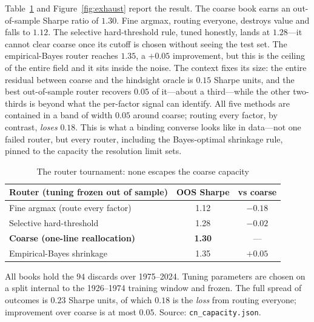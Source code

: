 \documentclass[12pt]{article}
\theoremstyle{plain}
\theoremstyle{definition}
\begin{document}
Table~\ref{tab:exhaustion} and Figure~\ref{fig:exhaust} report the result. The
coarse book earns an out-of-sample Sharpe ratio of $1.30$. Fine argmax, routing
everyone, destroys value and falls to $1.12$. The selective hard-threshold rule,
tuned honestly, lands at $1.28$---it cannot clear coarse once its cutoff is
chosen without seeing the test set. The empirical-Bayes router reaches $1.35$,
a $+0.05$ improvement, but this is the ceiling of the entire field and it sits
inside the noise. The context fixes its size: the entire residual between coarse
and the hindsight oracle is $0.15$ Sharpe units, and the best out-of-sample
router recovers $0.05$ of it---about a third---while the other two-thirds is
beyond what the per-factor signal can identify. All five methods are contained in a band of
width $0.05$ around coarse; routing every factor, by contrast, \emph{loses}
$0.18$. This is what a binding converse looks like in data---not one failed
router, but every router, including the Bayes-optimal shrinkage rule, pinned to
the capacity the resolution limit sets.

\begin{table}[t]
\centering
\caption{The router tournament: none escapes the coarse capacity}
\label{tab:exhaustion}
\begin{threeparttable}
\begin{tabular}{lcc}
\toprule
Router (tuning frozen out of sample) & OOS Sharpe & vs coarse \\
\midrule
Fine argmax (route every factor)        & 1.12 & $-0.18$ \\
Selective hard-threshold                & 1.28 & $-0.02$ \\
\textbf{Coarse (one-line reallocation)} & \textbf{1.30} & --- \\
Empirical-Bayes shrinkage               & 1.35 & $+0.05$ \\
\bottomrule
\end{tabular}
\begin{tablenotes}\footnotesize
\item All books hold the $94$ discards over 1975--2024. Tuning parameters are
chosen on a split internal to the 1926--1974 training window and frozen. The full
spread of outcomes is $0.23$ Sharpe units, of which $0.18$ is the \emph{loss}
from routing everyone; improvement over coarse is at most $0.05$. Source:
\texttt{cn\_capacity.json}.
\end{tablenotes}
\end{threeparttable}
\end{table}
\end{document}
